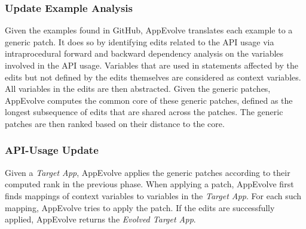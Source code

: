 \subsubsection{Update Example Analysis}
Given the examples found in GitHub, AppEvolve translates each example to a
generic patch. It does so by identifying edits related to the API usage via
intraprocedural forward and backward dependency analysis on the variables
involved in the API usage. Variables that are used in statements affected
by the edits but not defined by the edits themselves are considered as
context variables. All variables in the edits are then abstracted. Given
the generic patches, AppEvolve computes the common core of these generic
patches, defined as the longest subsequence of edits that are shared across
the patches. The generic patches are then ranked based on their distance to
the core.

\subsubsection{API-Usage Update}
Given a {\em Target App}, AppEvolve applies the generic patches according to their computed rank in the previous phase. When applying a patch, AppEvolve first finds mappings of context variables to variables in the {\em Target App}. For each such mapping, AppEvolve tries to apply the patch. If the edits are successfully applied, AppEvolve returns the {\em Evolved Target App}.

%

